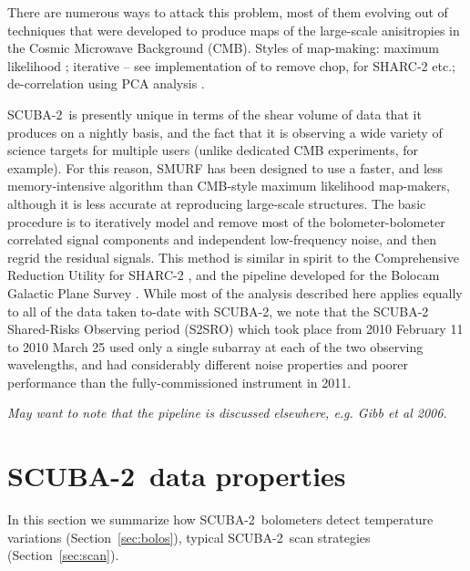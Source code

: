 \documentclass[useAMS,usenatbib,nofootinbib]{mn2e}
\newcommand{\scuba}{SCUBA-2}
\begin{document}
There are numerous ways to attack this problem, most of them evolving
out of techniques that were developed to produce maps of the
large-scale anisitropies in the Cosmic Microwave Background (CMB).  Styles
of map-making: maximum likelihood \citep[e.g.,][]{patanchon2008};
iterative -- see \citet{johnstone2000} implementation of
\citet{wright1996} to remove chop, \citet{kovacs2008} for SHARC-2
etc.; de-correlation using PCA analysis
\citep[e.g.][]{laurent2005,scott2008,aguirre2010}.

\scuba\ is presently unique in terms of the shear volume of data that
it produces on a nightly basis, and the fact that it is observing a
wide variety of science targets for multiple users (unlike dedicated
CMB experiments, for example). For this reason, SMURF has been
designed to use a faster, and less memory-intensive algorithm than
CMB-style maximum likelihood map-makers, although it is less accurate
at reproducing large-scale structures. The basic procedure is to
iteratively model and remove most of the bolometer-bolometer
correlated signal components and independent low-frequency noise, and
then regrid the residual signals. This method is similar in spirit to
the Comprehensive Reduction Utility for SHARC-2
\citep[CRUSH,][]{kovacs2008}, and the pipeline developed for the
Bolocam Galactic Plane Survey \citep{aguirre2010}. While most of the
analysis described here applies equally to all of the data taken
to-date with \scuba, we note that the SCUBA-2 Shared-Risks Observing
period (S2SRO) which took place from 2010 February 11 to 2010 March 25
used only a single subarray at each of the two observing wavelengths,
and had considerably different noise properties and poorer performance
than the fully-commissioned instrument in 2011.

\textit{May want to note that the pipeline is discussed elsewhere,
  e.g. Gibb et al 2006.}

\section{\scuba\ data properties}
\label{sec:data}

In this section we summarize how \scuba\ bolometers detect temperature
variations (Section~\ref{sec:bolos}), typical \scuba\ scan strategies
(Section~\ref{sec:scan}).

\end{document}
